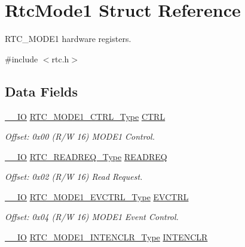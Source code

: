 \hypertarget{struct_rtc_mode1}{}\section{Rtc\+Mode1 Struct Reference}
\label{struct_rtc_mode1}


R\+T\+C\+\_\+\+M\+O\+D\+E1 hardware registers.  




{\ttfamily \#include $<$rtc.\+h$>$}

\subsection*{Data Fields}
\begin{DoxyCompactItemize}
\item 
\mbox{\hyperlink{core__cm0plus_8h_aec43007d9998a0a0e01faede4133d6be}{\+\_\+\+\_\+\+IO}} \mbox{\hyperlink{union_r_t_c___m_o_d_e1___c_t_r_l___type}{R\+T\+C\+\_\+\+M\+O\+D\+E1\+\_\+\+C\+T\+R\+L\+\_\+\+Type}} \mbox{\hyperlink{struct_rtc_mode1_abc953796e153257ef23f96db59073ff4}{C\+T\+RL}}
\begin{DoxyCompactList}\small\item\em Offset\+: 0x00 (R/W 16) M\+O\+D\+E1 Control. \end{DoxyCompactList}\item 
\mbox{\hyperlink{core__cm0plus_8h_aec43007d9998a0a0e01faede4133d6be}{\+\_\+\+\_\+\+IO}} \mbox{\hyperlink{union_r_t_c___r_e_a_d_r_e_q___type}{R\+T\+C\+\_\+\+R\+E\+A\+D\+R\+E\+Q\+\_\+\+Type}} \mbox{\hyperlink{struct_rtc_mode1_aa1779f0fc09662a56db255c1637c56c0}{R\+E\+A\+D\+R\+EQ}}
\begin{DoxyCompactList}\small\item\em Offset\+: 0x02 (R/W 16) Read Request. \end{DoxyCompactList}\item 
\mbox{\hyperlink{core__cm0plus_8h_aec43007d9998a0a0e01faede4133d6be}{\+\_\+\+\_\+\+IO}} \mbox{\hyperlink{union_r_t_c___m_o_d_e1___e_v_c_t_r_l___type}{R\+T\+C\+\_\+\+M\+O\+D\+E1\+\_\+\+E\+V\+C\+T\+R\+L\+\_\+\+Type}} \mbox{\hyperlink{struct_rtc_mode1_a4c3fb986310c6f3687e484ac365def5b}{E\+V\+C\+T\+RL}}
\begin{DoxyCompactList}\small\item\em Offset\+: 0x04 (R/W 16) M\+O\+D\+E1 Event Control. \end{DoxyCompactList}\item 
\mbox{\hyperlink{core__cm0plus_8h_aec43007d9998a0a0e01faede4133d6be}{\+\_\+\+\_\+\+IO}} \mbox{\hyperlink{union_r_t_c___m_o_d_e1___i_n_t_e_n_c_l_r___type}{R\+T\+C\+\_\+\+M\+O\+D\+E1\+\_\+\+I\+N\+T\+E\+N\+C\+L\+R\+\_\+\+Type}} \mbox{\hyperlink{struct_rtc_mode1_a8db76753ed9b826cdbd18a33586df2ca}{I\+N\+T\+E\+N\+C\+LR}}

\end{DoxyCompactItemize}
